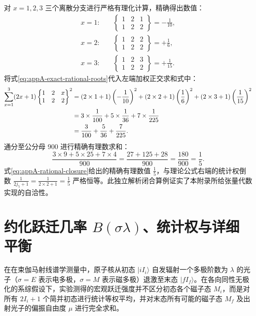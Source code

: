 对 $x=1, 2, 3$ 三个离散分支进行严格有理化计算，精确得出数值：
\begin{align}\label{eq:appA-exact-rational-roots}
x=1: \quad &\begin{Bmatrix} 1 & 2 & 1 \\ 1 & 2 & 2 \end{Bmatrix} = -\frac{1}{10} , \\
x=2: \quad &\begin{Bmatrix} 1 & 2 & 2 \\ 1 & 2 & 2 \end{Bmatrix} = +\frac{1}{6} , \\
x=3: \quad &\begin{Bmatrix} 1 & 2 & 3 \\ 1 & 2 & 2 \end{Bmatrix} = +\frac{1}{15} .
\end{align}
将式\eqref{eq:appA-exact-rational-roots}代入左端加权正交求和式中：
\begin{align}\label{eq:appA-rational-verification}
\sum_{x=1}^3 (2x + 1) \begin{Bmatrix} 1 & 2 & x \\ 1 & 2 & 2 \end{Bmatrix}^2 &= (2\times 1 + 1) \left(-\frac{1}{10}\right)^2 + (2\times 2 + 1) \left(\frac{1}{6}\right)^2 + (2\times 3 + 1) \left(\frac{1}{15}\right)^2 \notag \\
&= 3 \times \frac{1}{100} + 5 \times \frac{1}{36} + 7 \times \frac{1}{225} \notag \\
&= \frac{3}{100} + \frac{5}{36} + \frac{7}{225} .
\end{align}
通分至公分母 900 进行精确有理数求和：
\begin{equation}\label{eq:appA-rational-closure}
\frac{3 \times 9 + 5 \times 25 + 7 \times 4}{900} = \frac{27 + 125 + 28}{900} = \frac{180}{900} = \frac{1}{5} .
\end{equation}
式\eqref{eq:appA-rational-closure}给出的精确有理数值 $\frac{1}{5}$，与理论公式右端的统计权倒数 $\frac{1}{2j_5 + 1} = \frac{1}{2\times 2 + 1} = \frac{1}{5}$ 严格恒等。此独立解析闭合算例证实了本附录所给张量代数实现的自洽性。

\section{约化跃迁几率 $B(\sigma\lambda)$、统计权与详细平衡}\label{sec:appA-5}

在在束伽马射线谱学测量中，原子核从初态 $|i I_i\rangle$ 自发辐射一个多极阶数为 $\lambda$ 的光子（$\sigma = E$ 表示电多极，$\sigma = M$ 表示磁多极）退激至末态 $|f I_f\rangle$。在各向同性无极化的系综假设下，实验测得的宏观跃迁强度并不区分初态各个磁子态 $M_i$，而是对所有 $2I_i + 1$ 个简并初态进行统计等权平均，并对末态所有可能的磁子态 $M_f$ 及出射光子的偏振自由度 $\mu$ 进行完全求和。

